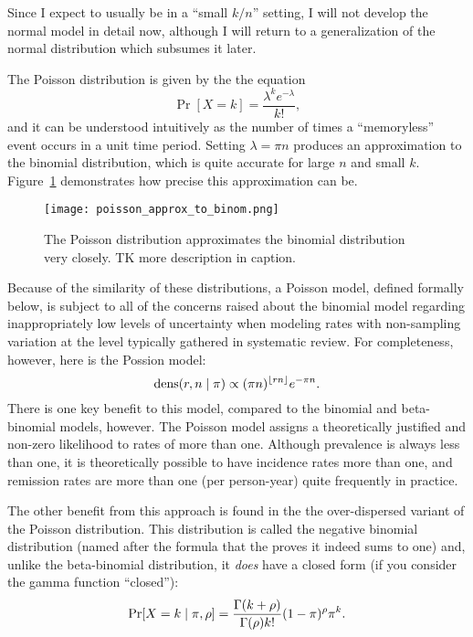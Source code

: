 Since I expect to usually be in a ``small $k/n$'' setting, I will not
develop the normal model in detail now, although I will return to a
generalization of the normal distribution which subsumes it later.

The Poisson distribution is given by the the equation
\[
\Pr[X=k] = \frac{\lambda^k e^{-\lambda}}{k!},
\]
and it can be understood intuitively as the number of times a
``memoryless'' event occurs in a unit time period.  Setting $\lambda =
\pi n$ produces an approximation to the binomial distribution, which
is quite accurate for large $n$ and small $k$.
Figure~\ref{fig:theory-rate_model-poisson_approx_to_binom}
demonstrates how precise this approximation can be.

\begin{figure}
\begin{center}
\texttt{[image: poisson\_approx\_to\_binom.png]}
\end{center}
\caption{The Poisson distribution approximates the binomial distribution very closely. TK more description in caption.}
\label{fig:theory-rate_model-poisson_approx_to_binom}
\end{figure}

Because of the similarity of these distributions, a Poisson model,
defined formally below, is subject to all of the concerns raised about the
binomial model regarding inappropriately low levels of uncertainty
when modeling rates with non-sampling variation at the level typically
gathered in systematic review.  For completeness, however, here is the Possion model:
\[
\operatorname{dens}(r,n\;|\; \pi) \propto (\pi n)^{\lfloor rn\rfloor} e^{-\pi n}.
\]
There is one key benefit to this model, compared to the binomial and
beta-binomial models, however.  The Poisson model assigns a
theoretically justified and non-zero likelihood to rates of more than
one.  Although prevalence is always less than one, it is theoretically
possible to have incidence rates more than one, and remission rates
are more than one (per person-year) quite frequently in practice.

The other benefit from this approach is found in the the
over-dispersed variant of the Poisson distribution.  This distribution
is called the negative binomial distribution (named after the formula
that the proves it indeed sums to one) and, unlike the beta-binomial
distribution, it \emph{does} have a closed form (if you consider the gamma function ``closed''):
\[
\operatorname{Pr}[X = k\;|\; \pi, \rho] = \frac{\Gamma(k+\rho)}{\Gamma(\rho)k!} (1-\pi)^\rho \pi^k.
\]

